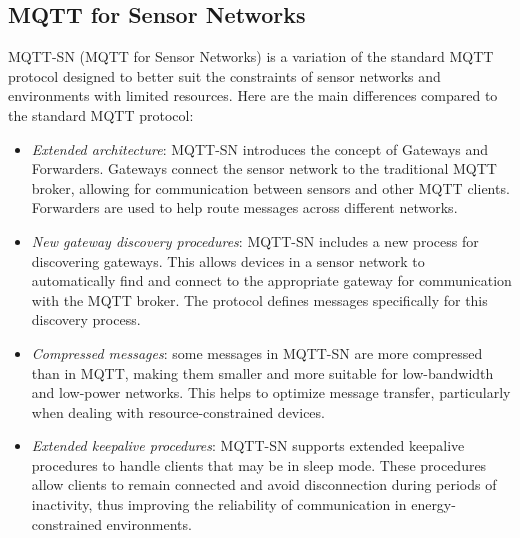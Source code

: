 \subsection{MQTT for Sensor Networks}
MQTT-SN (MQTT for Sensor Networks) is a variation of the standard MQTT protocol designed to better suit the constraints of sensor networks and environments with limited resources. 
Here are the main differences compared to the standard MQTT protocol:
\begin{itemize}
    \item \textit{Extended architecture}: MQTT-SN introduces the concept of Gateways and Forwarders. 
        Gateways connect the sensor network to the traditional MQTT broker, allowing for communication between sensors and other MQTT clients. 
        Forwarders are used to help route messages across different networks.
    \item \textit{New gateway discovery procedures}: MQTT-SN includes a new process for discovering gateways. 
        This allows devices in a sensor network to automatically find and connect to the appropriate gateway for communication with the MQTT broker.
            The protocol defines messages specifically for this discovery process.
    \item \textit{Compressed messages}: some messages in MQTT-SN are more compressed than in MQTT, making them smaller and more suitable for low-bandwidth and low-power networks. 
        This helps to optimize message transfer, particularly when dealing with resource-constrained devices.
    \item \textit{Extended keepalive procedures}: MQTT-SN supports extended keepalive procedures to handle clients that may be in sleep mode. 
        These procedures allow clients to remain connected and avoid disconnection during periods of inactivity, thus improving the reliability of communication in energy-constrained environments.
\end{itemize}